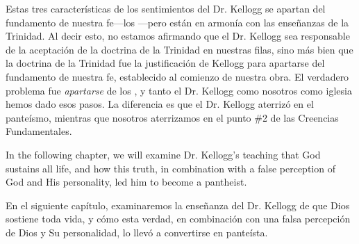 Estas tres características de los sentimientos del Dr. Kellogg se apartan del fundamento de nuestra fe—los —pero están en armonía con las enseñanzas de la Trinidad. Al decir esto, no estamos afirmando que el Dr. Kellogg sea responsable de la aceptación de la doctrina de la Trinidad en nuestras filas, sino más bien que la doctrina de la Trinidad fue la justificación de Kellogg para apartarse del fundamento de nuestra fe, establecido al comienzo de nuestra obra. El verdadero problema fue \textit{apartarse} de los , y tanto el Dr. Kellogg como nosotros como iglesia hemos dado esos pasos. La diferencia es que el Dr. Kellogg aterrizó en el panteísmo, mientras que nosotros aterrizamos en el punto \#2 de las Creencias Fundamentales.


In the following chapter, we will examine Dr. Kellogg's teaching that God sustains all life, and how this truth, in combination with a false perception of God and His personality, led him to become a pantheist.


En el siguiente capítulo, examinaremos la enseñanza del Dr. Kellogg de que Dios sostiene toda vida, y cómo esta verdad, en combinación con una falsa percepción de Dios y Su personalidad, lo llevó a convertirse en panteísta.






